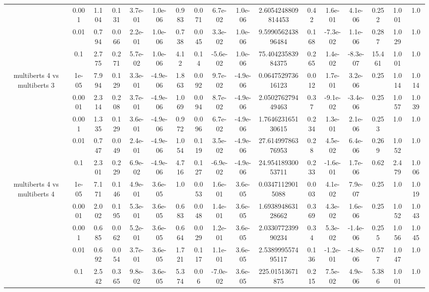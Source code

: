 \begin{tabular}{|c|c|c|c|c|c|c|c|c|c|c|c|c|c|c|c|c|}
 & 0.001 & 1.104 & 0.131 & 3.7e-01 & 1.0e-06 & 0.983 & 0.071 & 6.7e-02 & 1.0e-06 & 2.6054248809814453 & 0.42 & 1.6e-01 & 4.1e-06 & 0.252 & 1.001 & 1.0 \\
 & 0.01 & 0.794 & 0.066 & 2.2e-01 & 1.0e-06 & 0.738 & 0.045 & 3.3e-02 & 1.0e-06 & 9.599056243896484 & 0.168 & -7.3e-02 & 1.1e-06 & 0.287 & 1.029 & 1.0 \\
 & 0.1 & 2.775 & 0.271 & 5.7e-02 & 1.0e-06 & 4.12 & 0.14 & -5.6e-02 & 1.0e-06 & 75.40423583984375 & 0.265 & 1.4e-02 & -8.3e-07 & 15.461 & 1.001 & 1.0 \\
\hline
\multirow{5}{*}{multiberts 4 vs multiberts 3} & 1e-05 & 7.994 & 0.129 & 3.3e-01 & -4.9e-06 & 1.863 & 0.092 & 9.7e-02 & -4.9e-06 & 0.064752973616123 & 0.012 & 1.7e-01 & 3.2e-06 & 0.25 & 1.014 & 1.014 \\
 & 0.0001 & 2.314 & 0.208 & 3.7e-01 & -4.9e-06 & 1.069 & 0.094 & 8.7e-02 & -4.9e-06 & 2.050276279449463 & 0.37 & -9.1e-02 & -3.4e-06 & 0.25 & 1.057 & 1.039 \\
 & 0.001 & 1.335 & 0.129 & 3.6e-01 & -4.9e-06 & 0.972 & 0.096 & 6.7e-02 & -4.9e-06 & 1.764623165130615 & 0.234 & 1.3e-01 & 2.1e-06 & 0.253 & 1.0 & 1.0 \\
 & 0.01 & 0.747 & 0.049 & 2.4e-01 & -4.9e-06 & 1.054 & 0.119 & 3.5e-02 & -4.9e-06 & 27.61499786376953 & 0.28 & 4.5e-02 & 6.4e-06 & 0.269 & 1.052 & 1.0 \\
 & 0.1 & 2.301 & 0.229 & 6.9e-02 & -4.9e-06 & 4.716 & 0.127 & -6.9e-02 & -4.9e-06 & 24.95418930053711 & 0.233 & -1.6e-01 & 1.7e-06 & 0.62 & 2.479 & 1.006 \\
\hline
\multirow{5}{*}{multiberts 4 vs multiberts 4} & 1e-05 & 7.171 & 0.146 & 4.9e-01 & 3.6e-05 & 1.0 & 0.053 & 1.6e-01 & 3.6e-05 & 0.03471129015088 & 0.003 & 4.1e-02 & 7.9e-07 & 0.25 & 1.0 & 1.019 \\
 & 0.0001 & 2.002 & 0.195 & 5.3e-01 & 3.6e-05 & 0.683 & 0.048 & 1.4e-01 & 3.6e-05 & 1.693894863128662 & 0.369 & 4.3e-02 & 1.6e-06 & 0.25 & 1.052 & 1.043 \\
 & 0.001 & 0.685 & 0.062 & 5.2e-01 & 3.6e-05 & 0.664 & 0.029 & 1.2e-01 & 3.6e-05 & 2.033077239990234 & 0.34 & 5.3e-02 & -1.4e-06 & 0.255 & 1.056 & 1.045 \\
 & 0.01 & 0.692 & 0.054 & 3.7e-01 & 3.6e-05 & 1.721 & 0.117 & 1.1e-01 & 3.6e-05 & 2.538999557495117 & 0.136 & -1.2e-01 & -4.8e-06 & 0.577 & 1.047 & 1.0 \\
 & 0.1 & 2.542 & 0.365 & 9.8e-02 & 3.6e-05 & 5.374 & 0.06 & -7.0e-02 & 3.6e-05 & 225.01513671875 & 0.215 & 7.5e-02 & 4.9e-06 & 5.386 & 1.001 & 1.0 \\

\end{tabular}
